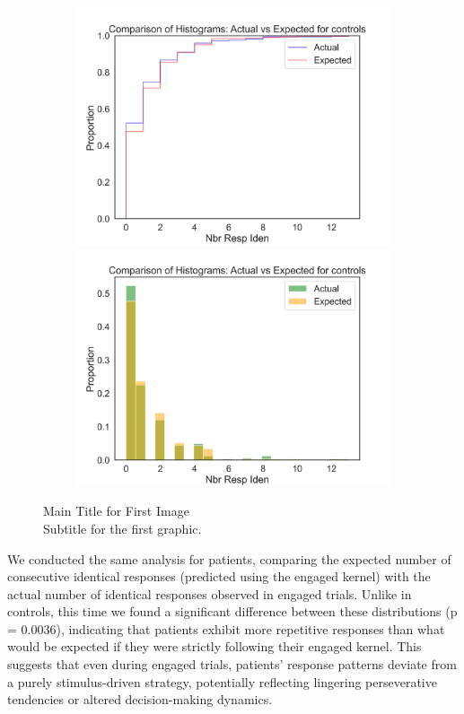 \begin{figure}[H]
    \centering
    \includegraphics[width=12cm,height=7cm]{MainLayout/Images/chapter9/actual_expected_controls_ecdf.jpg}
    \includegraphics[width=12cm,height=7cm]{MainLayout/Images/chapter9/actual_expected_controls_hist.jpg}
    \caption{Main Title for First Image \\ \small Subtitle for the first graphic.}
    \label{fig:actual_expected_controls}
\end{figure}
We conducted the same analysis for patients, comparing the expected number of consecutive identical responses (predicted using the engaged kernel) with the actual number of identical responses observed in engaged trials. Unlike in controls, this time we found a significant difference between these distributions (p = 0.0036), indicating that patients exhibit more repetitive responses than what would be expected if they were strictly following their engaged kernel. This suggests that even during engaged trials, patients' response patterns deviate from a purely stimulus-driven strategy, potentially reflecting lingering perseverative tendencies or altered decision-making dynamics. 

